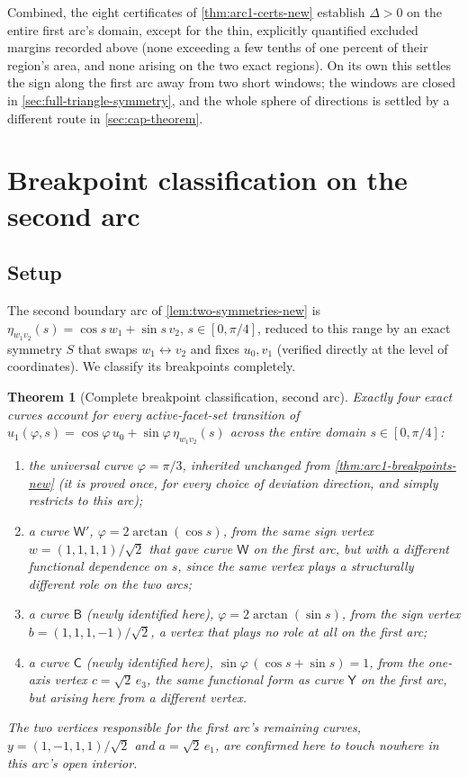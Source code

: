 \documentclass[11pt,reqno]{amsart}
\renewcommand{\_}{\origunderscore\allowbreak}
\numberwithin{equation}{section}
\theoremstyle{plain}
\newtheorem{thm}{Theorem}[section]
\theoremstyle{definition}
\theoremstyle{remark}
\newcommand{\tilt}{\varphi}                  %
\newcommand{\arcp}{s}                        %
\newcommand{\dev}{\eta}                      %
\newcommand{\defect}{\Delta}                 %
\begin{document}
Combined, the eight certificates of \cref{thm:arc1-certs-new} establish
$\defect>0$ on the entire first arc's domain, except for the thin,
explicitly quantified excluded margins recorded above (none exceeding a
few tenths of one percent of their region's area, and none arising on
the two exact regions). On its own this settles the sign along the
first arc away from two short windows; the windows are closed in
\cref{sec:full-triangle-symmetry}, and the whole sphere of directions
is settled by a different route in \cref{sec:cap-theorem}.
\section{Breakpoint classification on the second arc}\label{sec:arc2-breakpoints}

\subsection{Setup}

The second boundary arc of \cref{lem:two-symmetries-new} is
$\dev_{w_1v_2}(\arcp)=\cos\arcp\,w_1+\sin\arcp\,v_2$,
$\arcp\in[0,\pi/4]$, reduced to this range by an exact symmetry $S$
that swaps $w_1\leftrightarrow v_2$ and fixes $u_0,v_1$ (verified
directly at the level of coordinates). We classify its breakpoints completely.

\begin{thm}[Complete breakpoint classification, second arc]\label{thm:arc2-breakpoints-new}
Exactly four exact curves account for every active-facet-set transition
of $u_1(\tilt,\arcp)=\cos\tilt\,u_0+\sin\tilt\,\dev_{w_1v_2}(\arcp)$
across the entire domain $\arcp\in[0,\pi/4]$:
\begin{enumerate}[leftmargin=2em]
\item the universal curve $\tilt=\pi/3$, inherited unchanged from
\cref{thm:arc1-breakpoints-new} (it is proved once, for every choice of
deviation direction, and simply restricts to this arc);
\item a curve $\mathsf W'$, $\tilt=2\arctan(\cos\arcp)$, from the same
sign vertex $w=(1,1,1,1)/\sqrt2$ that gave curve $\mathsf W$ on the
first arc, but with a \emph{different} functional dependence on
$\arcp$, since the same vertex plays a structurally different role on
the two arcs;
\item a curve $\mathsf B$ (newly identified here),
$\tilt=2\arctan(\sin\arcp)$, from the sign vertex
$b=(1,1,1,-1)/\sqrt2$, a vertex that plays no role at all on the first
arc;
\item a curve $\mathsf C$ (newly identified here),
$\sin\tilt\,(\cos\arcp+\sin\arcp)=1$, from the one-axis vertex
$c=\sqrt2\,e_3$, the same functional form as curve $\mathsf Y$ on the
first arc, but arising here from a different vertex.
\end{enumerate}
The two vertices responsible for the first arc's remaining curves,
$y=(1,-1,1,1)/\sqrt2$ and $a=\sqrt2\,e_1$, are confirmed here to touch
nowhere in this arc's open interior.
\end{thm}
\end{document}
